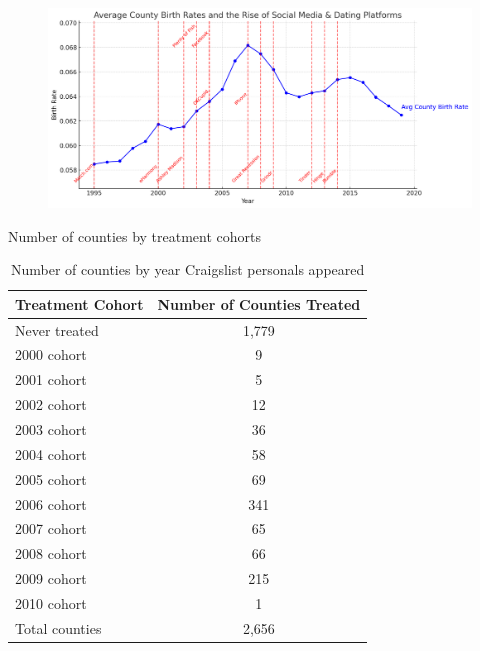 \documentclass{beamer}
\begin{document}
\begin{frame}

\begin{figure}
    \centering
    \includegraphics[height=0.6\textheight]{./lecture_includes/python_births.png}
\end{figure}

\end{frame}





\begin{frame}[shrink=20]{Number of counties by treatment cohorts}
\begin{table}[htbp]\centering
\caption{Number of counties by year Craigslist personals appeared}\label{tab:countybycohort}
\begin{tabular}{lc}
\toprule
\textbf{Treatment Cohort} & \textbf{Number of Counties Treated} \\
\midrule
Never treated&       1,779\\
2000 cohort &           9\\
2001 cohort &           5\\
2002 cohort &          12\\
2003 cohort &          36\\
2004 cohort &          58\\
2005 cohort &          69\\
2006 cohort &         341\\
2007 cohort &          65\\
2008 cohort &          66\\
2009 cohort &         215\\
2010 cohort &           1\\
\midrule
Total counties &     2,656 \\
\bottomrule
\end{tabular}
\end{table}
\end{frame}
\end{document}
